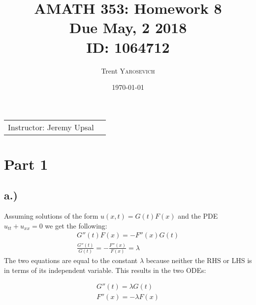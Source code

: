 \documentclass{article}
\title{AMATH 353: Homework 8 \\Due May, 2 2018 \\ ID: 1064712} %
\author{Trent \textsc{Yarosevich}} %
\date{\today} %
\begin{document}
\maketitle %
\setlength\parindent{1cm}

\begin{center}
\begin{tabular}{l r}
Instructor: Jeremy Upsal %
\end{tabular}
\end{center}


\section*{Part 1} 
\subsection*{a.)}
Assuming solutions of the form $u(x,t) = G(t)F(x)$ and the PDE $u_{tt} + u_{xx} = 0$ we get the following:
\begin{equation}
\begin{aligned}
G''(t)F(x) = -F''(x)G(t)\\
\frac{G''(t)}{G(t)} = -\frac{F''(x)}{F(x)} = \lambda
\end{aligned}
\end{equation}
The two equations are equal to the constant $\lambda $ because neither the RHS or LHS is in terms of its independent variable. This results in the two ODEs:
\begin{tcolorbox}[minipage,colback=white,arc=0pt,outer arc=0pt]
\begin{equation}
\begin{aligned}
G''(t) = \lambda G(t)\\
F''(x) = - \lambda F(x)
\end{aligned}
\end{equation}
\end{tcolorbox}
\end{document}
